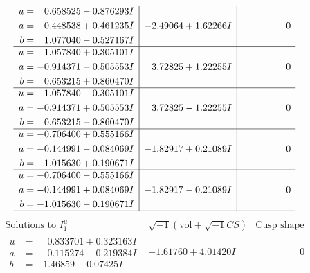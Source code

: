 \documentclass[1p]{elsarticle_modified}
\theoremstyle{definition}
\newcommand{\I}{\sqrt{-1}}
\begin{document}
$$\begin{array}{c|c|c}
\begin{aligned}
u &= \phantom{-}0.658525 - 0.876293 I \\
a &= -0.448538 + 0.461235 I \\
b &= \phantom{-}1.077040 - 0.527167 I\end{aligned}
 & -2.49064 + 1.62266 I & \phantom{-0.000000 } 0 \\ \hline\begin{aligned}
u &= \phantom{-}1.057840 + 0.305101 I \\
a &= -0.914371 - 0.505553 I \\
b &= \phantom{-}0.653215 + 0.860470 I\end{aligned}
 & \phantom{-}3.72825 + 1.22255 I & \phantom{-0.000000 } 0 \\ \hline\begin{aligned}
u &= \phantom{-}1.057840 - 0.305101 I \\
a &= -0.914371 + 0.505553 I \\
b &= \phantom{-}0.653215 - 0.860470 I\end{aligned}
 & \phantom{-}3.72825 - 1.22255 I & \phantom{-0.000000 } 0 \\ \hline\begin{aligned}
u &= -0.706400 + 0.555166 I \\
a &= -0.144991 - 0.084069 I \\
b &= -1.015630 + 0.190671 I\end{aligned}
 & -1.82917 + 0.21089 I & \phantom{-0.000000 } 0 \\ \hline\begin{aligned}
u &= -0.706400 - 0.555166 I \\
a &= -0.144991 + 0.084069 I \\
b &= -1.015630 - 0.190671 I\end{aligned}
 & -1.82917 - 0.21089 I & \phantom{-0.000000 } 0\\
 \hline 
 \end{array}$$\newpage$$\begin{array}{c|c|c}  
\text{Solutions to }I^u_{1}& \I (\text{vol} + \sqrt{-1}CS) & \text{Cusp shape}\\
 \hline 
\begin{aligned}
u &= \phantom{-}0.833701 + 0.323163 I \\
a &= \phantom{-}0.115274 - 0.219384 I \\
b &= -1.46859 - 0.07425 I\end{aligned}
 & -1.61760 + 4.01420 I & \phantom{-0.000000 } 0 \\ \hline\begin{aligned}

\end{aligned}
\end{array}$$
\end{document}
